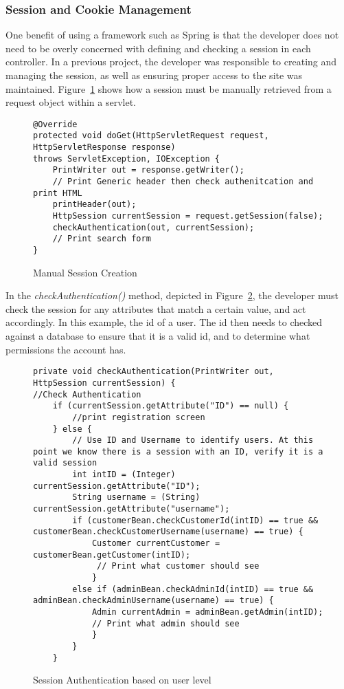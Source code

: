 \subsubsection{Session and Cookie Management}
One benefit of using a framework such as Spring is that the developer does not need to be overly concerned with defining and checking a session in each controller. In a previous project, the developer was responsible to creating and managing the session, as well as ensuring proper access to the site was maintained. Figure~\ref{fig:manualsession} shows how a session must be manually retrieved from a request object within a servlet.

\begin{figure}[H]
\begin{lstlisting}
@Override
protected void doGet(HttpServletRequest request, HttpServletResponse response)
throws ServletException, IOException {
    PrintWriter out = response.getWriter();
    // Print Generic header then check authenitcation and print HTML
    printHeader(out);
    HttpSession currentSession = request.getSession(false);
    checkAuthentication(out, currentSession);
    // Print search form
}
\end{lstlisting}
\caption{Manual Session Creation}
\label{fig:manualsession}
\end{figure}

In the \textit{checkAuthentication()} method, depicted in Figure~\ref{fig:sessionlevel}, the developer must check the session for any attributes that match a certain value, and act accordingly. In this example, the id of a user. The id then needs to checked against a database to ensure that it is a valid id, and to determine what permissions the account has.

\begin{figure}[H]
\begin{lstlisting}
private void checkAuthentication(PrintWriter out, HttpSession currentSession) {
//Check Authentication
	if (currentSession.getAttribute("ID") == null) {
		//print registration screen
    } else {
        // Use ID and Username to identify users. At this point we know there is a session with an ID, verify it is a valid session
        int intID = (Integer) currentSession.getAttribute("ID");
        String username = (String) currentSession.getAttribute("username");
        if (customerBean.checkCustomerId(intID) == true && customerBean.checkCustomerUsername(username) == true) {
			Customer currentCustomer = customerBean.getCustomer(intID);
			 // Print what customer should see
            } 
		else if (adminBean.checkAdminId(intID) == true && adminBean.checkAdminUsername(username) == true) {
            Admin currentAdmin = adminBean.getAdmin(intID);
			// Print what admin should see   
            }
        }
	}
\end{lstlisting}
\caption{Session Authentication based on user level}
\label{fig:sessionlevel}
\end{figure}

